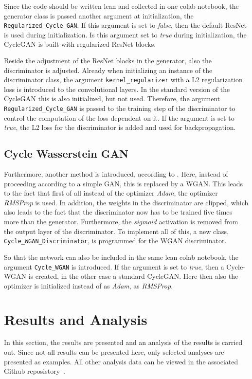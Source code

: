 \documentclass[fleqn,10pt]{SelfArx} %
\begin{document}
Since the code should be written lean and collected in one colab notebook, the generator class is passed another argument at initialization, the \texttt{Regularized\_Cycle\_GAN}. If this argument is set to \textit{false}, then the default \ac{ResNet} is used during initialization. Is this argument set to \textit{true} during initialization, the Cycle\ac{GAN} is built with regularized \ac{ResNet} blocks.

Beside the adjustment of the \ac{ResNet} blocks in the generator, also the discriminator is adjusted. Already when initializing an instance of the discriminator class, the argument \texttt{kernel\_regularizer} with a L2 regularization loss is introduced to the convolutional layers. In the standard version of the Cycle\ac{GAN} this is also initialized, but not used. Therefore, the argument \texttt{Regularized\_Cycle\_GAN} is passed to the training step of the discriminator to control the computation of the loss dependent on it. If the argument is set to \textit{true}, the L2 loss for the discriminator is added and used for backpropagation.


\subsection{Cycle Wasserstein \ac{GAN}}
Furthermore, another method is introduced, according to \cite{wgan-improvement}. Here, instead of proceeding according to a simple \ac{GAN}, this is replaced by a \ac{WGAN}. This leads to the fact that first of all instead of the optimizer \textit{Adam}, the optimizer \textit{\ac{RMSProp}} is used. In addition, the weights in the discriminator are clipped, which also leads to the fact that the discriminator now has to be trained five times more than the generator. Furthermore, the \textit{sigmoid} activation is removed from the output layer of the discriminator. To implement all of this, a new class, \texttt{Cycle\_WGAN\_Discriminator}, is programmed for the \ac{WGAN} discriminator.

So that the network can also be included in the same lean colab notebook, the argument \texttt{Cycle\_WGAN} is introduced. If the argument is set to \textit{true}, then a Cycle-\ac{WGAN} is created, in the other case a standard Cycle\ac{GAN}. Here then also the optimizer is initialized instead of as \textit{Adam}, as \textit{\ac{RMSProp}}.


\section{Results and Analysis}
In this section, the results are presented and an analysis of the results is carried out. Since not all results can be presented here, only selected analyses are presented as examples. All other analysis data can be viewed in the associated Github reposistory~\cite{ourGithubRepo}.
\end{document}
